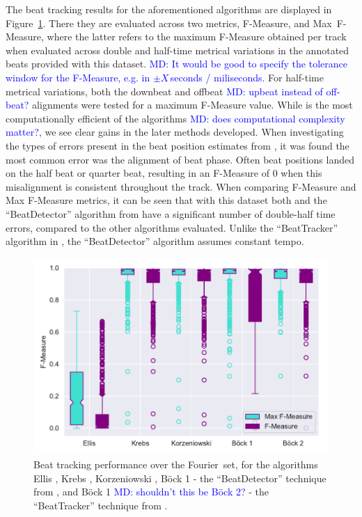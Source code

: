 \documentclass{article}
\newcommand{\setName}{Fourier}
\newcommand{\MD}[1]{\textcolor{blue}{MD: #1}}
\begin{document}
The beat tracking results for the aforementioned algorithms are displayed in Figure~\ref{fig:beat_results}. There they are evaluated across two metrics,
F-Measure, and Max~F-Measure, where the latter refers to the maximum F-Measure obtained per track when evaluated across double and half-time metrical variations
in the annotated beats provided with this dataset. \MD{It would be good to specify the tolerance window for the F-Measure, e.g. in $\pm X$\,seconds / miliseconds.} For half-time metrical variations, both the downbeat and offbeat \MD{upbeat instead of off-beat?} alignments were tested for a maximum F-Measure
value. While \cite{Ellis2007} is the most computationally efficient of the algorithms \MD{does computational complexity matter?}, we see clear gains in the later methods developed. When investigating the types
of errors present in the beat position estimates from \cite{Ellis2007}, it was found the most common error was the alignment of beat phase. Often beat positions landed
on the half beat or quarter beat, resulting in an F-Measure of 0 when this misalignment is consistent throughout the track.
When comparing F-Measure and Max F-Measure metrics, it can be seen that with 
this dataset both \cite{Ellis2007} and the ``BeatDetector'' algorithm from \cite{Bock2011} have a significant number of double-half time errors, compared to the other algorithms evaluated.
Unlike the ``BeatTracker'' algorithm in \cite{Bock2011}, the ``BeatDetector'' algorithm assumes constant tempo.

\begin{figure}
    \centerline{\includegraphics[width=\columnwidth]{figs/2019_04_09_19_15_00_Beat_TrackiMax_F-Measure.pdf}}
    \caption{Beat tracking performance over the \setName~set, for the algorithms Ellis \cite{Ellis2007}, Krebs \cite{Krebs2015}, Korzeniowski \cite{Korzeniowski2014}, B{\"o}ck 1 - the ``BeatDetector'' technique from \cite{Bock2011}, and B{\"o}ck 1 \MD{shouldn't this be B\"{o}ck 2?} - the ``BeatTracker'' technique from \cite{Bock2011}.}
    \label{fig:beat_results}
\end{figure}
\end{document}
